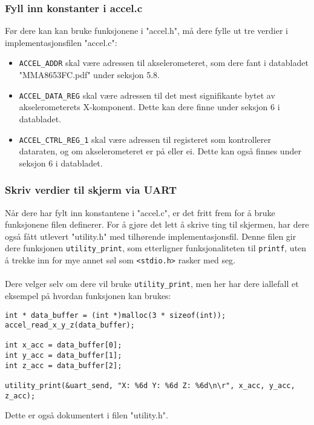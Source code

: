 \documentclass[11pt,a4paper]{article}
\begin{document}
\subsubsection{Fyll inn konstanter i accel.c}
Før dere kan kan bruke funksjonene i "accel.h", må dere fylle ut tre verdier i implementasjonsfilen "accel.c":
\begin{itemize}
\item \texttt{ACCEL_ADDR} skal være adressen til akselerometeret, som dere fant i databladet "MMA8653FC.pdf" under seksjon 5.8.
\item \texttt{ACCEL_DATA_REG} skal være adressen til det mest signifikante bytet av akselerometerets X-komponent. Dette kan dere finne under seksjon 6 i databladet.
\item \texttt{ACCEL_CTRL_REG_1} skal være adressen til registeret som kontrollerer dataraten, og om akselerometeret er på eller ei. Dette kan også finnes under seksjon 6 i databladet.
\end{itemize}

\subsubsection{Skriv verdier til skjerm via UART}
Når dere har fylt inn konstantene i "accel.c", er det fritt frem for å bruke funksjonene filen definerer. For å gjøre det lett å skrive ting til skjermen, har dere også fått utlevert "utility.h" med tilhørende implementasjonsfil. Denne filen gir dere funksjonen \texttt{utility_print}, som etterligner funksjonaliteten til \texttt{printf}, uten å trekke inn for mye annet søl som \texttt{<stdio.h>} rasker med seg.\\
\\
Dere velger selv om dere vil bruke \texttt{utility_print}, men her har dere iallefall et eksempel på hvordan funksjonen kan brukes:
\begin{verbatim}
int * data_buffer = (int *)malloc(3 * sizeof(int));
accel_read_x_y_z(data_buffer);

int x_acc = data_buffer[0];
int y_acc = data_buffer[1];
int z_acc = data_buffer[2];

utility_print(&uart_send, "X: %6d Y: %6d Z: %6d\n\r", x_acc, y_acc, z_acc);
\end{verbatim}
Dette er også dokumentert i filen "utility.h".
\end{document}
